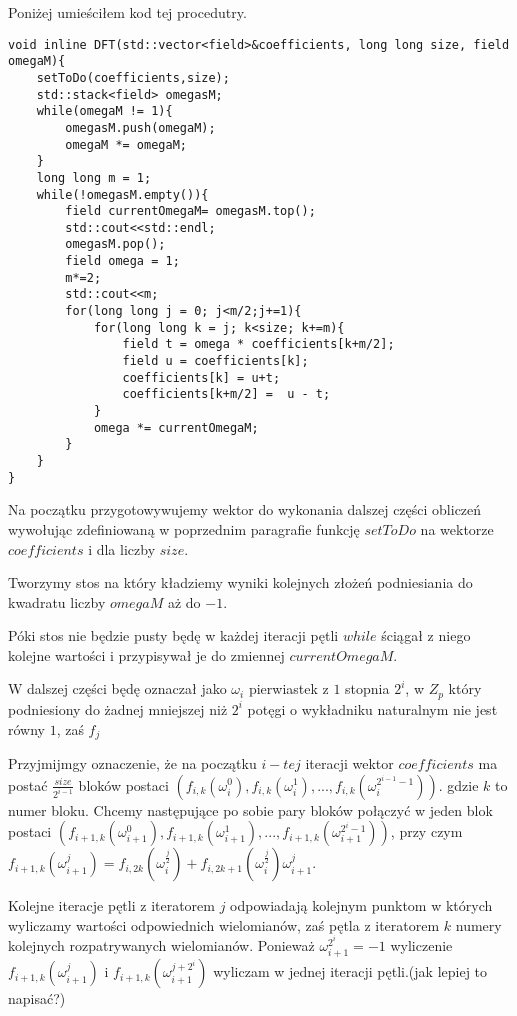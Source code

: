 \documentclass{article}
\begin{document}
Poniżej umieściłem kod tej procedutry.

\begin{lstlisting}
void inline DFT(std::vector<field>&coefficients, long long size, field omegaM){
    setToDo(coefficients,size);
    std::stack<field> omegasM;
    while(omegaM != 1){
        omegasM.push(omegaM);
        omegaM *= omegaM;
    }
    long long m = 1;
    while(!omegasM.empty()){   
        field currentOmegaM= omegasM.top();
        std::cout<<std::endl;
        omegasM.pop();
        field omega = 1;
        m*=2;
        std::cout<<m;
        for(long long j = 0; j<m/2;j+=1){
            for(long long k = j; k<size; k+=m){
                field t = omega * coefficients[k+m/2];
                field u = coefficients[k];
                coefficients[k] = u+t;
                coefficients[k+m/2] =  u - t;
            }
            omega *= currentOmegaM;
        }
    }
}
\end{lstlisting}




Na początku przygotowywujemy wektor do wykonania dalszej części obliczeń wywołując zdefiniowaną w poprzednim paragrafie funkcję $setToDo$ na wektorze $coefficients$ i dla liczby $size$. 

Tworzymy stos na który kładziemy wyniki kolejnych złożeń podniesiania do kwadratu liczby $omegaM$ aż do $-1$.

Póki stos nie będzie pusty będę w każdej iteracji pętli $while$ ściągał z niego kolejne wartości i przypisywał je do zmiennej $currentOmegaM$.

W dalszej części będę oznaczał jako $\omega_i$ pierwiastek z $1$ stopnia $2^i$, w $Z_p$ który podniesiony do żadnej mniejszej niż $2^i$ potęgi o wykładniku
naturalnym nie jest równy $1$, zaś $f_{j}$

Przyjmijmgy oznaczenie, że na początku $i-tej$ iteracji wektor $coefficients$ ma postać $\frac{size}{2^{i-1}}$ bloków postaci
$(f_{i,k}(\omega_i^0),f_{i,k}(\omega_i^1),...,f_{i,k}(\omega^{2^{i-1}-1}_i))$. gdzie $k$ to numer bloku. Chcemy
następujące po sobie pary bloków połączyć w jeden blok postaci $(f_{i+1,k}(\omega_{i+1}^0),f_{i+1,k}(\omega_{i+1}^1),...,
f_{i+1,k}(\omega^{2^{i}-1}_{i+1}))$, przy czym 
$f_{i+1,k}(\omega_{i+1}^j) = f_{i,2k}(\omega_{i}^\frac{j}{2})+f_{i,2k+1}(\omega_{i}^{\frac{j}{2}})\omega_{i+1}^j$. 

Kolejne iteracje pętli z iteratorem $j$ odpowiadają kolejnym punktom w których wyliczamy wartości odpowiednich wielomianów, zaś pętla z iteratorem $k$
numery kolejnych rozpatrywanych wielomianów. Ponieważ $\omega_{i+1}^{2^i}=-1$ wyliczenie $f_{i+1,k}(\omega_{i+1}^{j})$ i $f_{i+1,k}(\omega_{i+1}^{j+2^i})$ 
wyliczam w jednej iteracji pętli.(jak lepiej to napisać?)
\end{document}
